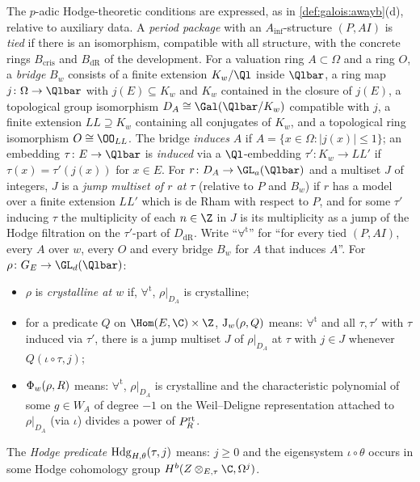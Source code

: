 \begin{definition}\label{def:pf:steps2:crys}
The $p$-adic Hodge-theoretic conditions are expressed, as in \cref{def:galois:awayb}(d), relative to
auxiliary data. A \emph{period package} with an $A_{\inf}$-structure $(P,AI)$ is \emph{tied} if
there is an isomorphism, compatible with all structure, with the concrete rings $B_{\mathrm{cris}}$
and $B_{\mathrm{dR}}$ of the development. For a valuation ring $A\subset\Omega$ and a ring $O$, a
\emph{bridge} $B_w$ consists of a finite extension $K_w/\Ql$ inside $\Qlbar$, a ring map
$j\colon\Omega\to\Qlbar$ with $j(E)\subseteq K_w$ and $K_w$ contained in the closure of $j(E)$, a
topological group isomorphism $D_A\cong\Gal(\Qlbar/K_w)$ compatible with $j$, a finite extension
$LL\supseteq K_w$ containing all conjugates of $K_w$, and a topological ring isomorphism
$O\cong\OO_{LL}$. The bridge \emph{induces} $A$ if $A=\{x\in\Omega:|j(x)|\le1\}$; an embedding
$\tau\colon E\to\Qlbar$ is \emph{induced} via a $\Ql$-embedding $\tau'\colon K_w\to LL'$ if
$\tau(x)=\tau'(j(x))$ for $x\in E$. For $r\colon D_A\to\GL_a(\Qlbar)$ and a multiset $J$ of integers,
$J$ is a \emph{jump multiset of $r$ at $\tau$} (relative to $P$ and $B_w$) if $r$ has a model over a
finite extension $LL'$ which is de Rham with respect to $P$, and for some $\tau'$ inducing $\tau$ the
multiplicity of each $n\in\Z$ in $J$ is its multiplicity as a jump of the Hodge filtration on the
$\tau'$-part of $D_{\mathrm{dR}}$. Write ``$\forall^{\mathrm t}$'' for ``for every tied $(P,AI)$, every
$A$ over $w$, every $O$ and every bridge $B_w$ for $A$ that induces $A$''. For
$\rho\colon G_E\to\GL_d(\Qlbar)$:
\begin{itemize}[nosep]
\item $\rho$ is \emph{crystalline at $w$} if, $\forall^{\mathrm t}$, $\rho|_{D_A}$ is crystalline;
\item for a predicate $Q$ on $\Hom(E,\C)\times\Z$, $\mathrm{J}_w(\rho,Q)$ means: $\forall^{\mathrm t}$
  and all $\tau,\tau'$ with $\tau$ induced via $\tau'$, there is a jump multiset $J$ of
  $\rho|_{D_A}$ at $\tau$ with $j\in J$ whenever $Q(\iota\circ\tau,j)$;
\item $\Phi_w(\rho,R)$ means: $\forall^{\mathrm t}$, $\rho|_{D_A}$ is crystalline and the
  characteristic polynomial of some $g\in W_A$ of degree $-1$ on the Weil--Deligne representation
  attached to $\rho|_{D_A}$ (via $\iota$) divides a power of $P^{\mathrm{rt}}_R$.
\end{itemize}
The \emph{Hodge predicate} $\mathrm{Hdg}_{H,\theta}(\tau,j)$ means: $j\ge0$ and the eigensystem
$\iota\circ\theta$ occurs in some Hodge cohomology group $H^b(Z\otimes_{E,\tau}\C,\Omega^j)$.
\end{definition}

